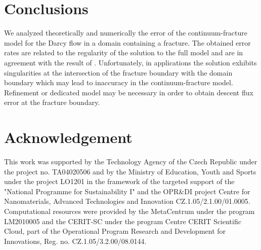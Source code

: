 \documentclass{llncs}
\renewcommand{\note}[2]{{\color{blue} \textbf{ #1:} \textit{#2}}}
\begin{document}
\section{Conclusions}

We analyzed theoretically and numerically the error of the continuum-fracture model for the Darcy flow in a domain containing a fracture.
The obtained error rates are related to the regularity of the solution to the full model and are in agreement with the result of \cite{martin_modeling_2005}.
Unfortunately, in applications the solution exhibits singularities at the intersection of the fracture boundary with the domain boundary 
which may lead to inaccuracy in the continuum-fracture model. Refinement or dedicated model may be necessary in order to obtain descent 
flux error at the fracture boundary.







\section*{Acknowledgement}
This work was supported by the Technology Agency of the Czech Republic under the
project no. TA04020506 and by the Ministry of Education, Youth and Sports under the project LO1201 in the framework of the targeted support of the "National Programme for Sustainability I" and the OPR\&DI project Centre for Nanomaterials, Advanced Technologies and Innovation CZ.1.05/2.1.00/01.0005.
Computational resources were provided by the MetaCentrum under the program LM2010005
and the CERIT-SC under the program Centre CERIT Scientific Cloud,
part of the Operational Program Research and Development for Innovations, Reg. no. CZ.1.05/3.2.00/08.0144.




\end{document}
